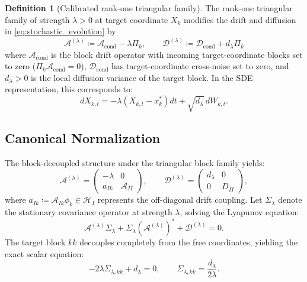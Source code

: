 \documentclass[preprint,12pt]{elsarticle}
\theoremstyle{plain}
\theoremstyle{definition}
\newtheorem{definition}[theorem]{Definition}
\theoremstyle{remark}
\newcommand{\cond}{\operatorname{cond}}
\begin{document}
    \begin{definition}[Calibrated rank-one triangular family]
        \label{def:soft_do}
        The rank-one triangular family of strength $\lambda > 0$ at target
        coordinate $X_k$ modifies the drift and diffusion in
        \eqref{eq:stochastic_evolution} by
        \begin{equation}
            \label{eq:soft_do_sde}
            \mathcal{A}^{(\lambda)} \coloneqq \mathcal{A}_{\cond} - \lambda \Pi_k, \qquad
            \mathcal{D}^{(\lambda)} \coloneqq \mathcal{D}_{\cond} + d_\lambda \Pi_k
        \end{equation}
        where $\mathcal{A}_{\cond}$ is the block drift operator with incoming target-coordinate blocks set to zero ($\Pi_k \mathcal{A}_{\cond} = 0$), $\mathcal{D}_{\cond}$ has target-coordinate cross-noise set to zero, and $d_\lambda > 0$ is the local diffusion variance of the target block. In the SDE representation, this corresponds to:
        \begin{equation}
            \label{eq:soft_do_sde_general}
            dX_{k,t} = -\lambda (X_{k,t} - x_k^*) dt + \sqrt{d_\lambda}\, dW_{k,t}.
        \end{equation}
    \end{definition}

    \subsection{Canonical Normalization}
    \label{sec:setup:calibration}

    The block-decoupled structure under the triangular block family yields:
    \begin{equation}
        \label{eq:block_decoupled_drift_diffusion}
        \mathcal{A}^{(\lambda)}=
    \begin{pmatrix}-\lambda&0\\a_{Ik}&\mathcal{A}_{II}\end{pmatrix},\qquad
        \mathcal{D}^{(\lambda)}=
    \begin{pmatrix}d_\lambda&0\\0&D_{II}\end{pmatrix},
    \end{equation}
    where $a_{Ik} \coloneqq \mathcal{A}_{Ik} \phi_k \in \mathcal{H}_I$ represents the off-diagonal drift coupling.
    Let $\Sigma_\lambda$ denote the stationary covariance operator at strength
    $\lambda$, solving the Lyapunov equation:
    \begin{equation}
        \label{eq:stationary_lyapunov_regularized}
        \mathcal{A}^{(\lambda)}\Sigma_\lambda + \Sigma_\lambda(\mathcal{A}^{(\lambda)})^* + \mathcal{D}^{(\lambda)} = 0.
    \end{equation}
    The target block $kk$ decouples completely from the free coordinates, yielding the exact scalar equation:
    \begin{equation}
        \label{eq:target_scalar_lyapunov}
        -2\lambda\Sigma_{\lambda,kk} + d_\lambda = 0,
        \qquad
        \Sigma_{\lambda,kk} = \frac{d_\lambda}{2\lambda}.
    \end{equation}
\end{document}
